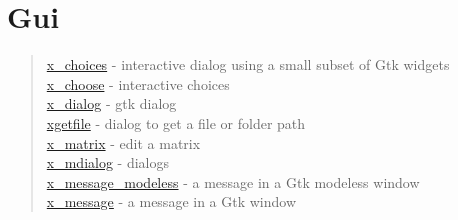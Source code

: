 \chapter*{Gui}

\begin{quote}
\noindent
\hyperlink{x_choices}{x\_choices} - interactive dialog using a small subset of Gtk widgets\\
\hyperlink{x_choose}{x\_choose} - interactive choices\\
\hyperlink{x_dialog}{x\_dialog} - gtk dialog\\
\hyperlink{xgetfile}{xgetfile} - dialog to get a file or folder path\\
\hyperlink{x_matrix}{x\_matrix} - edit a matrix\\
\hyperlink{x_mdialog}{x\_mdialog} - dialogs\\
\hyperlink{x_message_modeless}{x\_message\_modeless} - a message in a Gtk modeless window\\
\hyperlink{x_message}{x\_message} - a message in a Gtk window\\
\end{quote}










